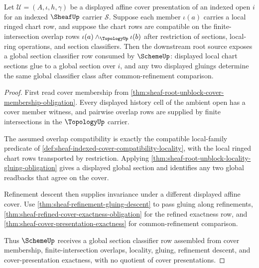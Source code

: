 \begin{theorem}
\label{thm:sheaf-scheme-gluing-cover-row}
Let $\mathcal{U}=(A,\iota,h,\gamma)$ be a displayed affine cover presentation of an indexed open $i$ for an indexed $\SheafUp$ carrier $\mathcal{S}$. Suppose each member $\iota(a)$ carries a local ringed chart row, and suppose the chart rows are compatible on the finite-intersection overlap rows $\iota(a)\wedge_{\TopologyUp}\iota(b)$ after restriction of sections, local-ring operations, and section classifiers. Then the downstream root source exposes a global section classifier row consumed by $\SchemeUp$: displayed local chart sections glue to a global section over $i$, and any two displayed gluings determine the same global classifier class after common-refinement comparison.
\end{theorem}
\begin{proof}
First read cover membership from \autoref{thm:sheaf-root-unblock-cover-membership-obligation}. Every displayed history cell of the ambient open has a cover member witness, and pairwise overlap rows are supplied by finite intersections in the $\TopologyUp$ carrier.

The assumed overlap compatibility is exactly the compatible local-family predicate of \autoref{def:sheaf-indexed-cover-compatibility-locality}, with the local ringed chart rows transported by restriction. Applying \autoref{thm:sheaf-root-unblock-locality-gluing-obligation} gives a displayed global section and identifies any two global readbacks that agree on the cover.

Refinement descent then supplies invariance under a different displayed affine cover. Use \autoref{thm:sheaf-refinement-gluing-descent} to pass gluing along refinements, \autoref{thm:sheaf-refined-cover-exactness-obligation} for the refined exactness row, and \autoref{thm:sheaf-cover-presentation-exactness} for common-refinement comparison.

Thus $\SchemeUp$ receives a global section classifier row assembled from cover membership, finite-intersection overlaps, locality, gluing, refinement descent, and cover-presentation exactness, with no quotient of cover presentations.
\end{proof}

